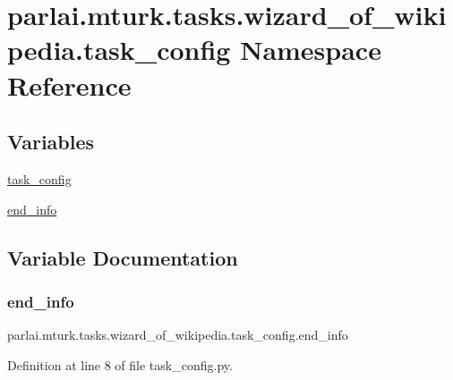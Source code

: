 \hypertarget{namespaceparlai_1_1mturk_1_1tasks_1_1wizard__of__wikipedia_1_1task__config}{}\section{parlai.\+mturk.\+tasks.\+wizard\+\_\+of\+\_\+wikipedia.\+task\+\_\+config Namespace Reference}
\label{namespaceparlai_1_1mturk_1_1tasks_1_1wizard__of__wikipedia_1_1task__config}
\subsection*{Variables}
\begin{DoxyCompactItemize}
\item 
\hyperlink{namespaceparlai_1_1mturk_1_1tasks_1_1wizard__of__wikipedia_1_1task__config_a3af76d193e83cdb4b21d97a348bd7c27}{task\+\_\+config}
\item 
\hyperlink{namespaceparlai_1_1mturk_1_1tasks_1_1wizard__of__wikipedia_1_1task__config_a38b6737e3c8a1013016d073b56ce9268}{end\+\_\+info}
\end{DoxyCompactItemize}


\subsection{Variable Documentation}
\mbox{\label{namespaceparlai_1_1mturk_1_1tasks_1_1wizard__of__wikipedia_1_1task__config_a38b6737e3c8a1013016d073b56ce9268}} 
\subsubsection{\texorpdfstring{end\+\_\+info}{end\_info}}
{\footnotesize\ttfamily parlai.\+mturk.\+tasks.\+wizard\+\_\+of\+\_\+wikipedia.\+task\+\_\+config.\+end\+\_\+info}



Definition at line 8 of file task\+\_\+config.\+py.

